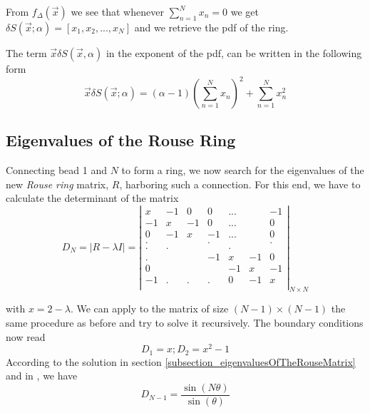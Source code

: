 \documentclass{report}
\begin{document}
From $f_\Delta(\vec{x})$ we see that whenever $\displaystyle \sum_{n=1}^{N}x_n = 0$ we get $\delta S(\vec{x};\alpha)=[x_1,x_2,...,x_N]$ and we retrieve the pdf of the ring. 

The term $\vec{x}\delta S(\vec{x},\alpha)$ in the exponent of the pdf, can be written in the following form 
\begin{equation*}
\vec{x}\delta S(\vec{x};\alpha)=(\alpha-1)\left( \sum_{n=1}^N x_n\right)^2 +\sum_{n=1}^N x_n^2
\end{equation*}


\subsection{Eigenvalues of the Rouse Ring}\label{subsection_eigenvaluesOfTheRouseRing}
Connecting bead 1 and $N$ to form a ring, we now search for the eigenvalues of the new \textit{Rouse ring} matrix, $R$, harboring such a connection. For this end, we have to calculate the determinant of the matrix
\begin{equation*}
D_N=|R-\lambda I|=\left|
\begin{matrix}
 x  & -1 &  0 &  0 &...&   & -1 \\
-1  &  x & -1 &  0 &...&   &  0 \\
 0  & -1 &  x & -1 &...&   &  0 \\
 .  &    &    &  . &   &   &  . \\
  . &   .&    &    &  .&   & \\
 .  &    &    & -1 & x &-1 & 0 \\
 0  &    &    &    & -1& x & -1 \\
 -1 &   .&  . & .  &  0&-1 &  x \\     
\end{matrix}
\right|_{N\times N}
\end{equation*}

with $x=2-\lambda$. We can apply to the matrix of size $(N-1)\times (N-1)$ the same procedure as before and try to solve it recursively. The boundary conditions now read
\begin{equation*}
D_1 = x; D_2 = x^2-1
\end{equation*}
According to the solution in section \ref{subsection_eigenvaluesOfTheRouseMatrix} and in \cite{lin2011polymer}, we have 
\begin{equation*}
D_{N-1}= \frac{\sin(N\theta)}{\sin(\theta)}
\end{equation*}
\end{document}
